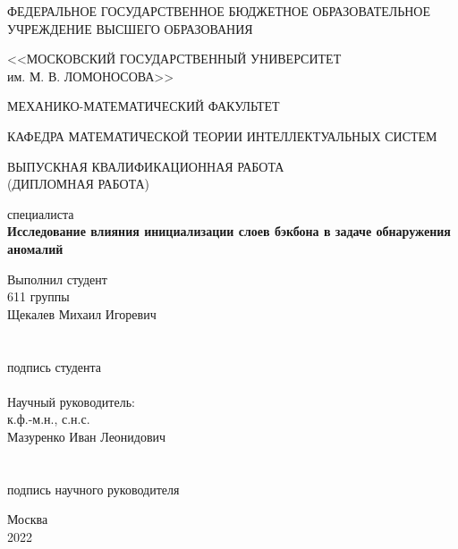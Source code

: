 \documentclass{article}
\begin{document}
\begin{titlepage}
	\begin{center}
		ФЕДЕРАЛЬНОЕ ГОСУДАРСТВЕННОЕ БЮДЖЕТНОЕ ОБРАЗОВАТЕЛЬНОЕ\\
		УЧРЕЖДЕНИЕ ВЫСШЕГО ОБРАЗОВАНИЯ
		
		<<МОСКОВСКИЙ ГОСУДАРСТВЕННЫЙ УНИВЕРСИТЕТ\\
		им. М. В. ЛОМОНОСОВА>>
		
		\vspace{0.25cm}
		
		МЕХАНИКО-МАТЕМАТИЧЕСКИЙ ФАКУЛЬТЕТ
		
		\vspace{0.25cm}
		
		КАФЕДРА МАТЕМАТИЧЕСКОЙ ТЕОРИИ ИНТЕЛЛЕКТУАЛЬНЫХ СИСТЕМ
		
		\vfill
		\textsc{ВЫПУСКНАЯ КВАЛИФИКАЦИОННАЯ РАБОТА\\
			(ДИПЛОМНАЯ РАБОТА)
		}
		
		специалиста\\[5mm]
		
		{\LARGE
			\textbf{Исследование влияния инициализации слоев бэкбона в задаче обнаружения аномалий}
		}
	\end{center}
	\vfill
	
	\hfill\begin{minipage}{0.41\textwidth}
		Выполнил студент\\
		611 группы\\
		Щекалев Михаил Игоревич\\
		\\
		\underline{\hspace{5cm}}\\
		подпись студента\\
		\\
		Научный руководитель:\\
		к.ф.-м.н., с.н.с.\\ Мазуренко Иван Леонидович\\
		\\
		\underline{\hspace{5cm}}\\
		подпись научного руководителя
	\end{minipage}
	\bigskip
	
	\vfill
	
	\begin{center}
		Москва
		\\
		2022
	\end{center}
\end{titlepage}
\end{document}
